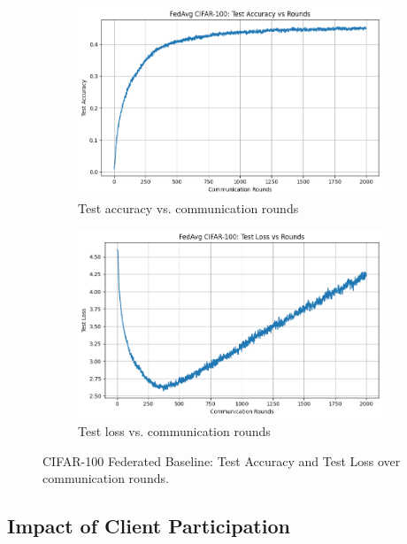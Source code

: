 \documentclass[10pt,twocolumn,letterpaper]{article}
\begin{document}
 \begin{figure}[H]
    \centering
    \begin{subfigure}{0.48\linewidth}
        \centering
        \includegraphics[width=\textwidth]{figs/cifar_fl_baseline_test_acc.png}
        \caption{Test accuracy vs. communication rounds}
        \label{fig:cifarBaselineTestAcc}
    \end{subfigure}
    \hfill
    \begin{subfigure}{0.48\linewidth}
        \centering
        \includegraphics[width=\textwidth]{figs/cifar_fl_baseline_test_loss.png}
        \caption{Test loss vs. communication rounds}
        \label{fig:cifarBaselineTestLoss}
    \end{subfigure}
    \caption{CIFAR-100 Federated Baseline: Test Accuracy and Test Loss over communication rounds.}
    \label{fig:cifarBaseline}
\end{figure}


\subsection{Impact of Client Participation}
\end{document}
